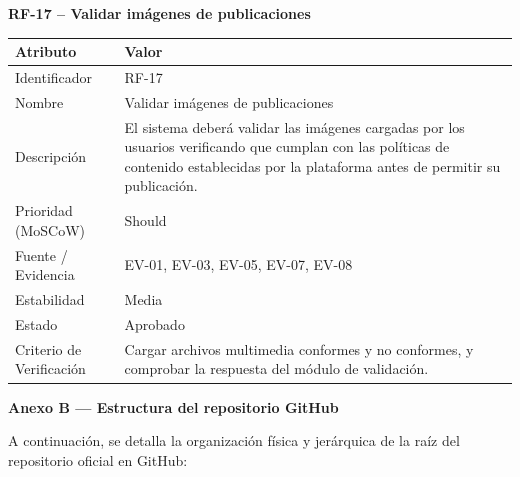 \documentclass[journal,onecolumn]{IEEEtran}
\begin{document}
	\textbf{RF-17 -- Validar imágenes de publicaciones}
	\begin{table}[H]
		\centering\small
		\begin{tabularx}{\linewidth}{|l|X|}
			\hline
			\textbf{Atributo} & \textbf{Valor} \\ \hline
			Identificador & RF-17 \\ \hline
			Nombre & Validar imágenes de publicaciones \\ \hline
			Descripción & El sistema deberá validar las imágenes cargadas por los usuarios verificando que cumplan con las políticas de contenido establecidas por la plataforma antes de permitir su publicación. \\ \hline
			Prioridad (MoSCoW) & Should \\ \hline
			Fuente / Evidencia & EV-01, EV-03, EV-05, EV-07, EV-08 \\ \hline
			Estabilidad & Media \\ \hline
			Estado & Aprobado \\ \hline
			Criterio de Verificación & Cargar archivos multimedia conformes y no conformes, y comprobar la respuesta del módulo de validación. \\ \hline
		\end{tabularx}
	\end{table}
	
	\newpage
	\textbf{Anexo B --- Estructura del repositorio GitHub}
	\label{anexo:arbol_repositorio}
	
	A continuación, se detalla la organización física y jerárquica de la raíz del repositorio oficial en GitHub:
	
\end{document}

